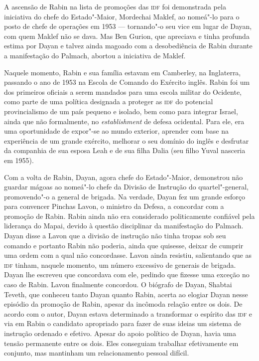 A ascensão de Rabin na lista de promoções das \textsc{idf} foi demonstrada pela
iniciativa do chefe do Estado"-Maior, Mordechai Maklef, ao nomeá"-lo
para o posto de chefe de operações em 1953 --- tornando"-o seu vice em lugar
de Dayan, com quem Maklef não se dava. Mas Ben Gurion, que apreciava e
tinha profunda estima por Dayan e talvez ainda magoado com a
desobediência de Rabin durante a manifestação do Palmach, abortou a
iniciativa de Maklef.

Naquele momento, Rabin e sua família estavam em Camberley, na Inglaterra,
passando o ano de 1953 na Escola de Comando do Exército inglês. Rabin
foi um dos primeiros oficiais a serem mandados para uma escola militar
do Ocidente, como parte de uma política designada a proteger as \textsc{idf} do
potencial provincialismo de um país pequeno e isolado, bem como para integrar Israel,
ainda que não formalmente, no \textit{establishment} de defesa
ocidental. Para ele, era uma oportunidade de expor"-se ao mundo
exterior, aprender com base na experiência de um grande exército,
melhorar o seu domínio do inglês e desfrutar da companhia de sua esposa
Leah e de sua filha Dalia (seu filho Yuval nasceria em 1955).

Com a volta de Rabin, Dayan, agora chefe do Estado"-Maior,
demonstrou não guardar mágoas ao nomeá"-lo chefe da Divisão de Instrução
do quartel"-general, promovendo"-o a general de brigada. Na verdade, Dayan
fez um grande esforço para convencer Pinchas Lavon, o ministro da
Defesa, a concordar com a promoção de Rabin. Rabin ainda não era considerado
politicamente confiável pela liderança do Mapai, devido à questão
disciplinar da manifestação do Palmach. Dayan disse a Lavon que a
divisão de instrução não tinha tropas sob seu comando e portanto Rabin
não poderia, ainda que quisesse, deixar de cumprir uma ordem com a qual
não concordasse. Lavon ainda resistiu, salientando que as \textsc{idf} tinham,
naquele momento, um número excessivo de generais de brigada. Dayan lhe
escreveu que concordava com ele, pedindo que fizesse uma exceção no caso
de Rabin. Lavon finalmente concordou. O biógrafo de Dayan, Shabtai
Teveth, que conheceu tanto Dayan quanto Rabin, acerta ao elogiar Dayan
nesse episódio da promoção de Rabin, apesar da incômoda relação entre os
dois. De acordo com o autor, Dayan estava determinado a transformar o
espírito das \textsc{idf} e via em Rabin o candidato apropriado para fazer de
suas ideias um sistema de instrução ordenado e efetivo. Apesar do
apoio político de Dayan, havia uma tensão permanente entre os dois. Eles
conseguiam trabalhar efetivamente em conjunto, mas mantinham um
relacionamento pessoal difícil.

